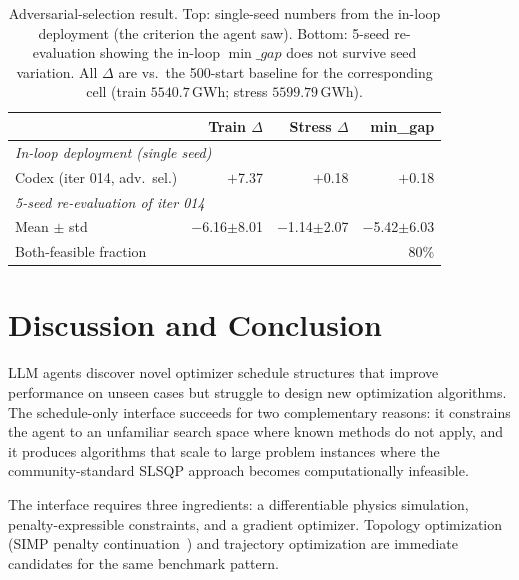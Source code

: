 \documentclass{article}
\newcommand{\AdvValSeeds}{5}
\newcommand{\AdvValTrainGapMean}{$-$6.16}
\newcommand{\AdvValTrainGapStd}{8.01}
\newcommand{\AdvValStressGapMean}{$-$1.14}
\newcommand{\AdvValStressGapStd}{2.07}
\newcommand{\AdvValMinGapMean}{$-$5.42}
\newcommand{\AdvValMinGapStd}{6.03}
\newcommand{\AdvValBothFeasPct}{80\%}
\begin{document}
\begin{table}[t]
\caption{Adversarial-selection result. Top: single-seed numbers
from the in-loop deployment (the criterion the agent saw). Bottom:
\AdvValSeeds-seed re-evaluation showing the in-loop $\min\_gap$
does not survive seed variation. All $\Delta$ are vs.\ the
500-start baseline for the corresponding cell
(train $5540.7$\,GWh; stress $5599.79$\,GWh).}
\label{tab:adversarial}
\vskip 0.1in
\centering
\begin{small}
\begin{sc}
\begin{tabular}{lrrr}
\toprule
                                  & Train $\Delta$ & Stress $\Delta$ & min\_gap \\
\midrule
\multicolumn{4}{l}{\emph{In-loop deployment (single seed)}} \\
Codex (iter 014, adv.\ sel.)      & $+$7.37 & $+$0.18 & $+$0.18 \\
\midrule
\multicolumn{4}{l}{\emph{\AdvValSeeds-seed re-evaluation of iter 014}} \\
Mean $\pm$ std                    & \AdvValTrainGapMean$\pm$\AdvValTrainGapStd & \AdvValStressGapMean$\pm$\AdvValStressGapStd & \AdvValMinGapMean$\pm$\AdvValMinGapStd \\
Both-feasible fraction            & \multicolumn{3}{r}{\AdvValBothFeasPct} \\
\bottomrule
\end{tabular}
\end{sc}
\end{small}
\vskip -0.1in
\end{table}

\section{Discussion and Conclusion}

LLM agents discover novel optimizer schedule structures that improve
performance on unseen cases but struggle to design new optimization
algorithms. The schedule-only interface succeeds for two complementary
reasons: it constrains the agent to an unfamiliar search space where
known methods do not apply, and it produces algorithms that scale to
large problem instances where the community-standard SLSQP approach
becomes computationally infeasible.

The interface requires three ingredients: a differentiable physics
simulation, penalty-expressible constraints, and a gradient optimizer.
Topology optimization (SIMP penalty
continuation~\cite{rojas2015continuation}) and trajectory optimization
are immediate candidates for the same benchmark pattern.
\end{document}
